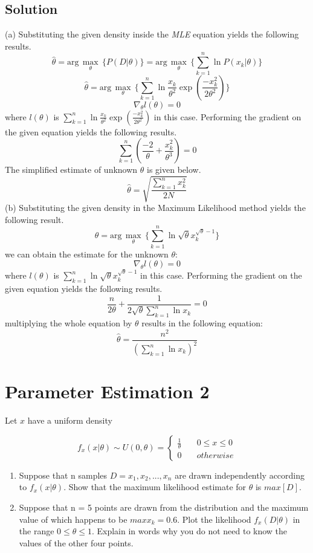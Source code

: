 \documentclass[12pt]{article}
\numberwithin{equation}{section}
\numberwithin{table}{section}
\numberwithin{figure}{section}
\begin{document}
\subsection*{Solution}
(a) Substituting the given density inside the \textit{MLE} equation yields the following results.
\begin{equation}
	\hat{\theta} = \text{arg}\,\max\limits_{\theta}\, \{P(D|\theta)\} = \text{arg}\,\max\limits_{\theta}\, \{\sum_{k = 1}^{n} \ln P(x_k|\theta)\} 
\end{equation}
$$
	\hat{\theta} = \text{arg}\,\max\limits_{\theta}\, \{\sum_{k = 1}^{n} \ln \frac{x_k}{\theta^2}\exp(\frac{-x_k^2}{2\theta^2})\}
$$
$$
	\nabla_{\theta}l(\theta) = 0 
$$
where $l(\theta)$ is $\sum_{k = 1}^{n} \ln \frac{x_k}{\theta^2}\exp(\frac{-x_k^2}{2\theta^2})$ in this case. Performing the gradient on the given equation yields the following results.
$$
	\sum_{k = 1}^{n} (\frac{-2}{\theta} + \frac{x_k^2}{\theta^3}) = 0
$$
The simplified estimate of unknown $\theta$ is given below.
$$
	\hat{\theta} = \sqrt{\frac{\sum_{k = 1}^{n} x_k^2}{2N}}
$$
(b) Substituting the given density in the Maximum Likelihood method yields the following result.
\begin{equation}
	\hat{\theta} = \text{arg}\,\max\limits_{\theta}\, \{\sum_{k = 1}^{n} \ln \sqrt{\theta}x_k^{\sqrt{\theta} - 1}\}
\end{equation}
we can obtain the estimate for the unknown $\theta$:
$$
	\nabla_{\theta}l(\theta) = 0 
$$
where $l(\theta)$ is $\sum_{k = 1}^{n} \ln \sqrt{\theta}x_k^{\sqrt{\theta} - 1}$ in this case. Performing the gradient on the given equation yields the following results.
$$
	\frac{n}{2\theta} + \frac{1}{2\sqrt{\theta}\sum_{k = 1}^{n}\ln x_k} = 0
$$
multiplying the whole equation by $\theta$ results in the following equation:
$$
	\hat{\theta} = \frac{n^2}{(\sum_{k = 1}^{n}\ln x_k)^2}
$$

\section{Parameter Estimation 2}
Let $x$ have a uniform density

	\[ f_x(x|\theta) \sim U(0, \theta) = 
	\begin{cases}
	\frac{1}{\theta}       & \quad 0 \leq x \leq 0\\
	0  & \quad otherwise
	\end{cases}
	\]
	
\begin{enumerate}[label=(\alph*)]
	\item Suppose that n samples $ D = {x_1, x_2, ..., x_n}$ are drawn independently according to $f_x(x|\theta)$. Show that the maximum likelihood estimate for $\theta$ is $max[D]$.
	\item Suppose that n = 5 points are drawn from the distribution and the maximum value of which happens to be $max{x_k} = 0.6$. Plot the likelihood $f_x(D|\theta)$ in the range $0 \leq \theta \leq 1$. Explain in words why you do not need to know the values of the other four points.
\end{enumerate}
\end{document}
